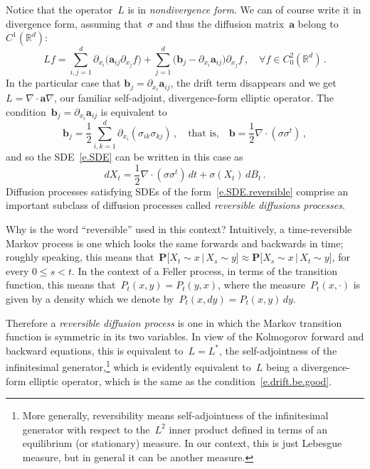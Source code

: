 \documentclass[11pt]{article} %
\numberwithin{equation}{section}
\theoremstyle{definition}
\newcommand*{\Rd}{\ensuremath{\mathbb{R}^d}}
\renewcommand{\b}{\ensuremath{\mathbf{b}}}
\renewcommand{\a}{\mathbf{a}}
\begin{document}
Notice that the operator~$L$ is in \emph{nondivergence form}. 
We can of course write it in divergence form, assuming that~$\sigma$ and thus the diffusion matrix~$\a$ belong to~$C^1(\Rd)$:
\begin{equation*}
L f = 
\sum_{i,j=1}^d \partial_{x_i} \bigl(  \a_{ij} \partial_{x_j} f \bigr)
+
\sum_{j=1}^d \bigl( \b_j - \partial_{x_i} \a_{ij} \bigr) \partial_{x_j} f 
\,, \quad \forall f \in C^2_0(\Rd)\,.
\end{equation*}
In the particular case that $\b_j = \partial_{x_i} \a_{ij}$, the drift term disappears and we get~$L = \nabla \cdot \a\nabla$, our familiar self-adjoint, divergence-form elliptic operator. The condition~$\b_j = \partial_{x_i} \a_{ij}$ is equivalent to
\begin{equation}
\label{e.drift.be.good}
\b_j = \frac12 \sum_{i,k=1}^d 
\partial_{x_i}( \sigma_{ik}\sigma_{kj}) 
\,,
\quad \mbox{that is,} \quad 
\b 
=
\frac12 \nabla \cdot (\sigma \sigma^t) \,,
\end{equation}
and so the SDE~\eqref{e.SDE} can be written in this case as
\begin{equation}
\label{e.SDE.reversible}
dX_t = \frac12 \nabla \cdot (\sigma \sigma^t)  \, dt + \sigma(X_t) \, dB_t
\,.
\end{equation}
Diffusion processes satisfying SDEs of the form~\eqref{e.SDE.reversible} comprise an important subclass of diffusion processes called \emph{reversible diffusions processes}.


\smallskip

Why is the word ``reversible'' used in this context? Intuitively, a time-reversible Markov process is one which looks the same forwards and backwards in time; roughly speaking, this means that~$\mathbf{P}\bigl[ X_t \sim x \,|\, X_s \sim y \bigr] \approx \mathbf{P}\bigl[ X_s \sim x \,|\, X_t \sim y \bigr]$, for every $0\leq s< t$. In the context of a Feller process, in terms of the transition function, this means that~$P_t(x,y) = P_t(y,x)$, where the measure~$P_t(x,\cdot)$ is given by a density which we denote by~$P_t(x,dy) = P_t(x,y)\,dy$.

\smallskip

Therefore a \emph{reversible diffusion process} is one in which the Markov transition function is symmetric in its two variables. In view of the Kolmogorov forward and backward equations, this is equivalent to~$L=L^*$, the self-adjointness of the infinitesimal generator,\footnote{More generally, reversibility means self-adjointness of the infinitesimal generator with respect to the~$L^2$ inner product defined in terms of an equilibrium (or stationary) measure. In our context, this is just Lebesgue measure, but in general it can be another measure.} which is evidently equivalent to~$L$ being a divergence-form elliptic operator, which is the same as the condition~\eqref{e.drift.be.good}. 
\end{document}
